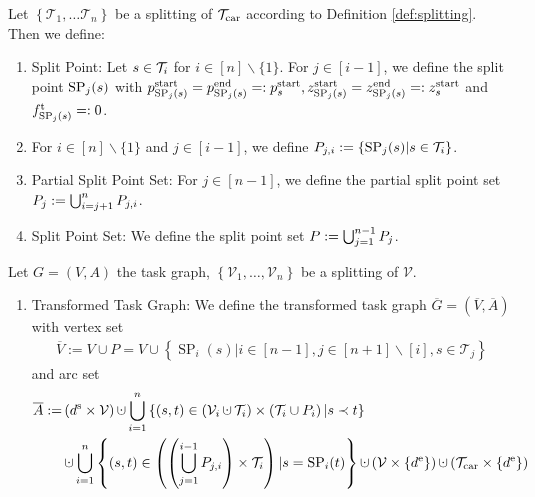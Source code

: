 \begin{definition}

Let $\left\{\mathcal{T}_1,\dots\mathcal{T}_n\right\}$ be a splitting of $\mathcal{T}_{\operatorname{car}}$ according to Definition \ref{def:splitting}. Then we define:

\begin{enumerate}
	\item{Split Point: Let $s\in\mathcal{T}_i$ for $i\in[n]\backslash\{1\}$. For $j\in[i-1]$, we define the split point $\operatorname{SP}_j(s)$ with $p^{\operatorname{start}}_{\operatorname{SP}_j(s)}=p^{\operatorname{end}}_{\operatorname{SP}_j(s)}=:p^{\operatorname{start}}_s, z^{\operatorname{start}}_{\operatorname{SP}_j(s)}=z^{\operatorname{end}}_{\operatorname{SP}_j(s)}=:z^{\operatorname{start}}_s$ and $f^{\operatorname{t}}_{\operatorname{SP}_j(s)}=:0$.}
	\item{For $i\in[n]\backslash\{1\}$ and $j\in[i-1]$, we define $P_{j,i}:=\left\{\operatorname{SP}_j(s)|s\in\mathcal{T}_i\right\}$.}
	\item{Partial Split Point Set: For $j\in[n-1]$, we define the partial split point set $P_j:=\bigcup_{i=j+1}^n P_{j,i}$.}
	\item{Split Point Set: We define the split point set $P:=\bigcup_{j=1}^{n-1}P_j$.}
\end{enumerate}

Let $G=(V,A)$ the task graph, $\left\{\mathcal{V}_1,\dots,\mathcal{V}_n\right\}$ be a splitting of $\mathcal{V}$.

\begin{enumerate}
	\item{Transformed Task Graph: We define the transformed task graph $\overline{G}=\left(\overline{V},\overline{A}\right)$ with vertex set
		\begin{align*}
			\overline{V} := V\cup P = V\cup\left\{\operatorname{SP}_i(s)|i\in[n-1],j\in[n+1]\backslash[i],s\in\mathcal{T}_j\right\}
		\end{align*}
		and arc set
		\begin{align*}
			\overline{A} := & \left(\ds\times\mathcal{V}\right)\cupdot\bigcup_{i=1}^n\left\{(s,t)\in\left(\Vi\cupdot\Ti\right)\times\left(\Ti\cup P_i\right)|s\prec t\right\} \\
			& \cupdot\bigcup_{i=1}^n\left\{(s,t)\in\left(\left(\bigcup_{j=1}^{i-1} P_{j,i}\right)\times\Ti\right)|s=\operatorname{SP}_i(t)\right\}\cupdot \left(\mathcal{V}\times\left\{\de\right\}\right)\cupdot\left(\Tcar\times\left\{\de\right\}\right)
		\end{align*}}
\end{enumerate}

\end{definition}

